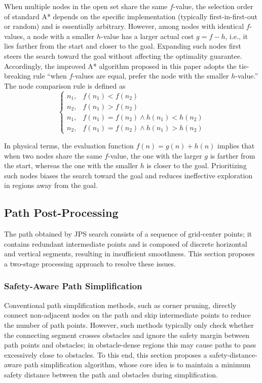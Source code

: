 \documentclass[lettersize,journal]{IEEEtran}
\begin{document}
When multiple nodes in the open set share the same $f$-value, the selection order of standard A* depends on the specific implementation (typically first-in-first-out or random) and is essentially arbitrary. However, among nodes with identical $f$-values, a node with a smaller $h$-value has a larger actual cost $g = f - h$, i.e., it lies farther from the start and closer to the goal. Expanding such nodes first steers the search toward the goal without affecting the optimality guarantee. Accordingly, the improved A* algorithm proposed in this paper adopts the tie-breaking rule ``when $f$-values are equal, prefer the node with the smaller $h$-value.'' The node comparison rule is defined as
\begin{equation}
\begin{cases}
n_1, & f(n_1) < f(n_2) \\
n_2, & f(n_1) > f(n_2) \\
n_1, & f(n_1) = f(n_2) \land h(n_1) < h(n_2) \\
n_2, & f(n_1) = f(n_2) \land h(n_1) > h(n_2)
\end{cases}
\label{eq:tbreak}
\end{equation}

In physical terms, the evaluation function $f(n) = g(n) + h(n)$ implies that when two nodes share the same $f$-value, the one with the larger $g$ is farther from the start, whereas the one with the smaller $h$ is closer to the goal. Prioritizing such nodes biases the search toward the goal and reduces ineffective exploration in regions away from the goal.

\subsection{Path Post-Processing}
\label{subsec:post}

The path obtained by JPS search consists of a sequence of grid-center points; it contains redundant intermediate points and is composed of discrete horizontal and vertical segments, resulting in insufficient smoothness. This section proposes a two-stage processing approach to resolve these issues.

\subsubsection{Safety-Aware Path Simplification}

Conventional path simplification methods, such as corner pruning, directly connect non-adjacent nodes on the path and skip intermediate points to reduce the number of path points. However, such methods typically only check whether the connecting segment crosses obstacles and ignore the safety margin between path points and obstacles; in obstacle-dense regions this may cause paths to pass excessively close to obstacles. To this end, this section proposes a safety-distance-aware path simplification algorithm, whose core idea is to maintain a minimum safety distance between the path and obstacles during simplification.
\end{document}
